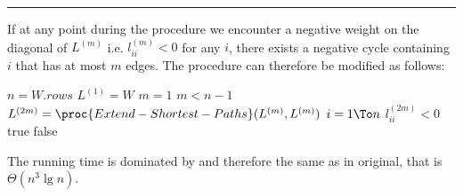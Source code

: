\documentclass[a4paper,parskip=half]{scrartcl}
\newenvironment{solution}[1]{
\rule{\textwidth}{1pt}
\begin{description}[leftmargin=3em, style=nextline, topsep=0em,
font={\bfseries\rmfamily}]
\item[#1]
}{
\end{description}
}
\begin{document}
\begin{solution}{II-5}

If at any point during the procedure we encounter a negative weight on the
diagonal of $L^{(m)}$ i.e. $l_{ii}^{(m)} < 0$ for any $i$, there exists a negative cycle
containing $i$ that has at most $m$ edges. The procedure
 can therefore be modified as follows:

\begin{codebox}
\li $n = W.rows$
\li $L^{(1)} = W$
\li $m = 1$
\li \While $m < n - 1$ \Do
\li   $L^{(2m)} = \proc{Extend-Shortest-Paths}(L^{(m)}, L^{(m)})$
\li   \For $i = 1 \To n$ \Do
\li     \If $l_{ii}^{(2m)} < 0$ \Then
\li       \Return true \End \End \End
\li \Return false
\end{codebox}

The running time is dominated by  and therefore
the same as in original, that is $\Theta(n^3 \lg n)$.

\end{solution}
\end{document}
